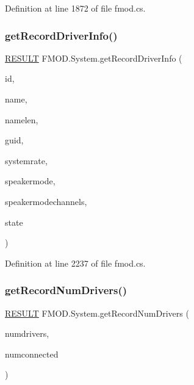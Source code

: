 Definition at line 1872 of file fmod.\+cs.

\mbox{\label{class_f_m_o_d_1_1_system_a2e7455272a4d0a4bedd135153fb34596}} 
\subsubsection{\texorpdfstring{get\+Record\+Driver\+Info()}{getRecordDriverInfo()}}
{\footnotesize\ttfamily \hyperlink{namespace_f_m_o_d_a305d1176ef3f8c8815861a60407ac33d}{R\+E\+S\+U\+LT} F\+M\+O\+D.\+System.\+get\+Record\+Driver\+Info (\begin{DoxyParamCaption}\item[{int}]{id,  }\item[{String\+Builder}]{name,  }\item[{int}]{namelen,  }\item[{out Guid}]{guid,  }\item[{out int}]{systemrate,  }\item[{out \hyperlink{namespace_f_m_o_d_aa0732e7e8efd3b96b526a7f2f8479634}{S\+P\+E\+A\+K\+E\+R\+M\+O\+DE}}]{speakermode,  }\item[{out int}]{speakermodechannels,  }\item[{out \hyperlink{namespace_f_m_o_d_a0fa62396ce674d121c3f766c24942924}{D\+R\+I\+V\+E\+R\+\_\+\+S\+T\+A\+TE}}]{state }\end{DoxyParamCaption})}



Definition at line 2237 of file fmod.\+cs.

\mbox{\label{class_f_m_o_d_1_1_system_ab617c3cd4711e1440af81f997d8b757e}} 
\subsubsection{\texorpdfstring{get\+Record\+Num\+Drivers()}{getRecordNumDrivers()}}
{\footnotesize\ttfamily \hyperlink{namespace_f_m_o_d_a305d1176ef3f8c8815861a60407ac33d}{R\+E\+S\+U\+LT} F\+M\+O\+D.\+System.\+get\+Record\+Num\+Drivers (\begin{DoxyParamCaption}\item[{out int}]{numdrivers,  }\item[{out int}]{numconnected }\end{DoxyParamCaption})}



